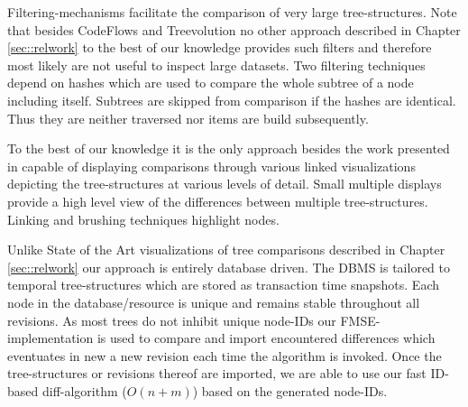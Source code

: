 Filtering-mechanisms facilitate the comparison of very large tree-structures. Note that besides CodeFlows\cite{telea2008code} and Treevolution\cite{theron2006hierarchical} no other approach described in Chapter \ref{sec::relwork} to the best of our knowledge provides such filters and therefore most likely are not useful to inspect large datasets. Two filtering techniques depend on hashes which are used to compare the whole subtree of a node including itself. Subtrees are skipped from comparison if the hashes are identical. Thus they are neither traversed nor items are build subsequently.

To the best of our knowledge it is the only approach besides the work presented in \cite{bremm2011interactive} capable of displaying comparisons through various linked visualizations depicting the tree-structures at various levels of detail. Small multiple displays provide a high level view of the differences between multiple tree-structures. Linking and brushing techniques highlight nodes. %

Unlike State of the Art visualizations of tree comparisons described in Chapter \ref{sec::relwork} our approach is entirely database driven. The DBMS is tailored to temporal tree-structures which are stored as transaction time snapshots. Each node in the database/resource is unique and remains stable throughout all revisions. As most trees do not inhibit unique node-IDs our FMSE-implementation is used to compare and import encountered differences which eventuates in new a new revision each time the algorithm is invoked. Once the tree-structures or revisions thereof are imported, we are able to use our fast ID-based diff-algorithm ($O(n+m)$) based on the generated node-IDs.
 
